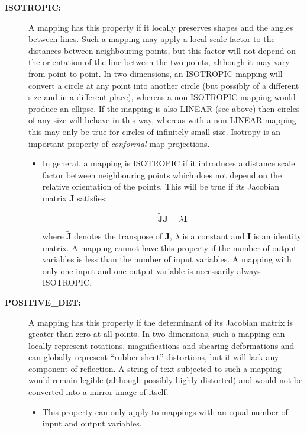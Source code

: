 \documentclass[twoside,nolof,11pt]{starlink}
\providecommand{\name}[1]{\small{#1}}
\begin{document}
\begin{description}
\item[\textbf{ISOTROPIC:}] A mapping has this property if it locally preserves
shapes and the angles between lines.
Such a mapping may apply a local scale factor to the distances between
neighbouring points, but this factor will not depend on the orientation
of the line between the two points, although it may vary from point to
point.
In two dimensions, an \name{ISOTROPIC} mapping will convert a circle at any
point into another circle (but possibly of a different size and in a
different place), whereas a non-\name{ISOTROPIC} mapping would produce an
ellipse.
If the mapping is also \name{LINEAR} (see above) then circles of
any size will behave in this way, whereas with a non-\name{LINEAR}
mapping this may only be true for circles of infinitely small size.
Isotropy is an important property of \emph{conformal} map projections.

\begin{itemize}
\item In general, a mapping is \name{ISOTROPIC} if it introduces a distance
scale factor between neighbouring points which does not depend on the
relative orientation of the points.
This will be true if its Jacobian matrix $\textbf{J}$ satisfies:

\begin{equation}
\mathbf{\tilde{J}} \mathbf{J} = \lambda \mathbf{I}
\end{equation}

where $\mathbf{\tilde{J}}$ denotes the transpose of $\mathbf{J}$, $\lambda$ is a
constant and $\mathbf{I}$ is an identity matrix.
A mapping cannot have this property if the number of output variables is
less than the number of input variables.
A mapping with only one input and one output variable is necessarily always
\name{ISOTROPIC}.

\end{itemize}

\item[\textbf{POSITIVE\_DET:}] A mapping has this property if the determinant
of its Jacobian matrix is greater than zero at all points.
In two dimensions, such a mapping can locally represent rotations,
magnifications and shearing deformations and can globally represent
``rubber-sheet'' distortions, but it will lack any component of reflection.
A string of text subjected to such a mapping would remain legible (although
possibly highly distorted) and would not be converted into a mirror image of
itself.

\begin{itemize}
\item This property can only apply to mappings with an equal number of input
and output variables.
\end{itemize}


\end{description}
\end{document}
